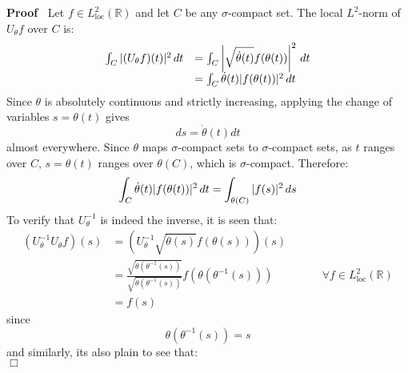 \documentclass{article}
\newcommand{\tmop}[1]{\ensuremath{\operatorname{#1}}}
\newenvironment{proof}{\noindent\textbf{Proof\ }}{\hspace*{\fill}$\Box$\medskip}
\begin{document}
\begin{proof}
  Let $f \in L^2_{\tmop{loc}} (\mathbb{R})$ and let $C$ be any
  $\sigma$-compact set. The local $L^2$-norm of $U_{\theta} f$ over $C$ is:
  \begin{equation}
    \begin{array}{ll}
      \int_C | (U_{\theta} f) (t) |^2  \hspace{0.17em} dt & = \int_C \left|
      \sqrt{\dot{\theta} (t)} f (\theta (t)) \right|^2  \hspace{0.17em} dt\\
      & = \int_C \dot{\theta} (t) |f (\theta (t)) |^2  \hspace{0.17em} dt
    \end{array}
  \end{equation}
  Since $\theta$ is absolutely continuous and strictly increasing, applying
  the change of variables $s = \theta (t)$ gives
  \begin{equation}
    ds = \dot{\theta} (t) dt
  \end{equation}
  almost everywhere. Since $\theta$ maps $\sigma$-compact sets to
  $\sigma$-compact sets, as $t$ ranges over $C$, $s = \theta (t)$ ranges over
  $\theta (C)$, which is $\sigma$-compact. Therefore:
  \begin{equation}
    \int_C \dot{\theta} (t)  |f (\theta (t)) |^2 \hspace{0.17em} dt =
    \int_{\theta (C)} |f (s) |^2  \hspace{0.17em} ds
  \end{equation}
  To verify that $U_{\theta}^{- 1}$ is indeed the inverse, it is seen that:
  \begin{equation}
    \begin{array}{llcccc}
      (U_{\theta}^{- 1} U_{\theta} f) (s) & = \left( U_{\theta}^{- 1} 
      \sqrt{\dot{\theta} (s)} f (\theta (s)) \right) (s) &  &  &  & \\
      & = \frac{\sqrt{\dot{\theta} (\theta^{- 1} (s))}}{\sqrt{\dot{\theta}
      (\theta^{- 1} (s))}} f (\theta (\theta^{- 1} (s))) &  &  &  & \forall f
      \in L^2_{\tmop{loc}} (\mathbb{R})\\
      & = f (s) &  &  &  & 
    \end{array}
  \end{equation}
  since
  \begin{equation}
    \theta (\theta^{- 1} (s)) = s
  \end{equation}
  and similarly, its also plain to see that:
  \begin{equation}

\end{equation}
\end{proof}
\end{document}
